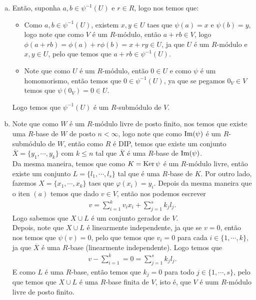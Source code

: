 \begin{homeworkProblem}[6]
\begin{solution}
\begin{enumerate}[(a)]
      Pelo que temos que dado $v\in V$, nos podemos escrever como combinação linear de $X\cup L$. Assim, nos podemos concluir que $V=\left\langle X\cup L \right\rangle$, isto é, que $V$ é finitamente gerado.
    \item Então, suponha $a,b\in \psi^{-1}(U)$ e $r\in R$, logo nos temos que:\\
      \begin{itemize}
        \item Como $a,b\in\psi^{-1}(U)$, existem $x,y\in U$ taes que $\psi(a)=x$ e $\psi(b)=y$, logo note que como $V$ é um $R$-módulo, então $a+rb\in V$, logo $\phi(a+rb)=\phi(a)+r\phi(b)=x+ry\in U$, ja que $U$ é um $R$-módulo e $x,y\in U$, pelo que temos que $a+rb\in \psi^{-1}(U)$.
        \item Note que como $U$ é um $R$-módulo, então $0\in U$ e como $\psi$ é um homomorismo, então temos que $0\in\psi^{-1}(U)$, ya que se pegamos $0_V\in V$ temos que $\psi(0_V)=0\in U$. 
      \end{itemize}
      Logo temos que $\psi^{-1}(U)$ é um $R$-submódulo de $V$.
    \item Note que como $W$ é um $R$-módulo livre de posto finito, nos temos que existe uma $R$-base de $W$ de posto $n<\infty$, logo note que como $\operatorname{Im}(\psi)$ é um $R$-submódulo de $W$, então como $R$ é DIP, temos que existe um conjunto $\overline{X}=\{y_1,\cdots,y_k\}$ com $k\leq n$ tal que $\overline{X}$ é uma $R$-base de $\operatorname{Im}(\psi)$.\\
      Da mesma maneira, temos que como $K=\operatorname{Ker}\psi$ é um $R$-módulo livre, então existe um conjunto $L=\{l_1,\cdots,l_s\}$ tal que é uma $R$-base de $K$. Por outro lado, fazemos $X=\{x_1,\cdots,x_k\}$ taes que $\varphi(x_i)=y_i$. Depois da mesma maneira que o iten $(a)$ temos que dado $v\in V$, então nos podemos escrever
      \begin{align*}
        v=\sum_{i=1}^{k}v_ix_i+\sum_{j=1}^{s}k_jl_j.
      \end{align*}
      Logo sabemos que $X\cup L$ é um conjunto gerador de $V$.\\
      Depois, note que $X\cup L$ é linearmente independente, ja que se $v=0$, então nos temos que $\psi(v)=0$, pelo que temos que $v_i=0$ para cada $i\in\{1,\cdots,k\}$, ja que $\overline{X}$ é uma $R$-base (linearmente independente). Logo temos que
      \begin{align*}
        v-\sum_{i=1}^{k}=0=\sum_{j=1}^{s}k_jl_j.
      \end{align*}
      E como $L$ é uma $R$-base, então temos que $k_j=0$ para todo $j\in\{1,\cdots,s\}$, pelo que temos que $X\cup L$ é uma $R$-base finita de $V$, isto é, que $V$ é uum $R$-módulo livre de posto finito. 
  \end{enumerate}
  \end{solution}
\end{homeworkProblem}
